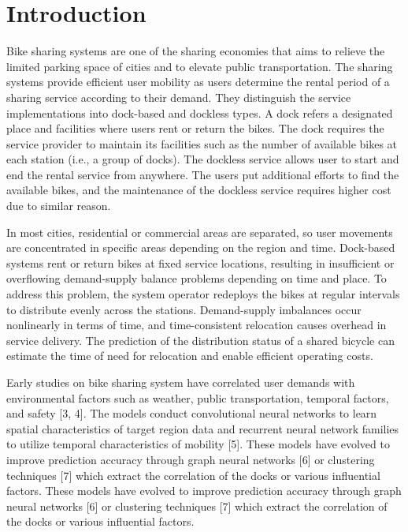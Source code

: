 \documentclass[conference]{IEEEtran}
\begin{document}
\section{Introduction}
 Bike sharing systems are one of the sharing economies that aims to relieve the limited parking space of cities and to elevate public transportation. The sharing systems provide efficient user mobility as users determine the rental period of a sharing service according to their demand. They distinguish the service implementations into dock-based and dockless types. A dock refers a designated place and facilities where users rent or return the bikes. The dock requires the service provider to maintain its facilities such as the number of available bikes at each station (i.e., a group of docks). The dockless service allows user to start and end the rental service from anywhere. The users put additional efforts to find the available bikes, and the maintenance of the dockless service requires higher cost due to similar reason.

 In most cities, residential or commercial areas are separated, so user movements are concentrated in specific areas depending on the region and time. Dock-based systems rent or return bikes at fixed service locations, resulting in insufficient or overflowing demand-supply balance problems depending on time and place. To address this problem, the system operator redeploys the bikes at regular intervals to distribute evenly across the stations. Demand-supply imbalances occur nonlinearly in terms of time, and time-consistent relocation causes overhead in service delivery. The prediction of the distribution status of a shared bicycle can estimate the time of need for relocation and enable efficient operating costs.

 Early studies on bike sharing system have correlated user demands with environmental factors such as weather, public transportation, temporal factors, and safety [3, 4]. The models conduct convolutional neural networks to learn spatial characteristics of target region data and recurrent neural network families to utilize temporal characteristics of mobility [5]. These models have evolved to improve prediction accuracy through graph neural networks [6] or clustering techniques [7] which extract the correlation of the docks or various influential factors. These models have evolved to improve prediction accuracy through graph neural networks [6] or clustering techniques [7] which extract the correlation of the docks or various influential factors. 
\end{document}
